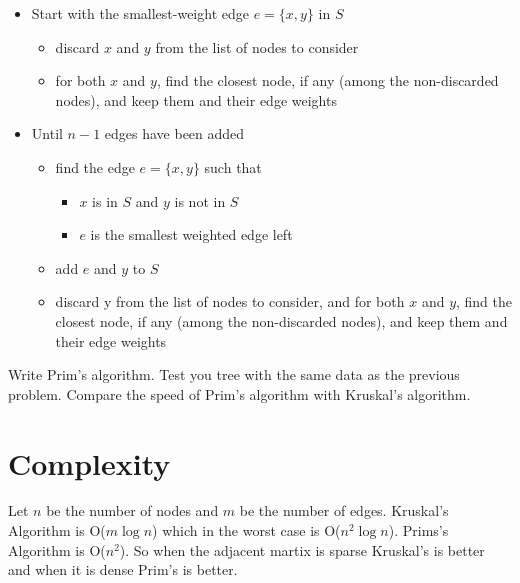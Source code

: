 \begin{itemize}

\item Start with the smallest-weight edge $e = \{x, y\}$ in $S$

\begin{itemize}

\item discard $x$ and $y$ from the list of nodes to consider

\item for both $x$ and $y$, find the closest node, if any (among the non-discarded nodes), and keep them and their edge weights

\end{itemize}

\item Until $n-1$ edges have been added

\begin{itemize}

\item find the edge $e = \{x, y\}$ such that

\begin{itemize}

\item $x$ is in $S$ and $y$ is not in $S$

\item $e$ is the smallest weighted edge left

\end{itemize}

\item add $e$ and $y$ to $S$

\item discard y from the list of nodes to consider, and for both $x$ and $y$, find the closest node, if any (among the non-discarded nodes), and keep them and their edge weights

\end{itemize}

\end{itemize}

\begin{problem}
Write Prim's algorithm.
Test you tree with the same data as the previous problem.
Compare the speed of Prim's algorithm with Kruskal's algorithm. 
\end{problem}

\section*{Complexity}
Let $n$ be the number of nodes and $m$ be the number of edges.
Kruskal's Algorithm is O($m\log{n}$) which in the worst case is O($n^2\log{n}$).
Prims's Algorithm is O($n^2$).
So when the adjacent martix is sparse Kruskal's is better and when it is dense Prim's is better. 
